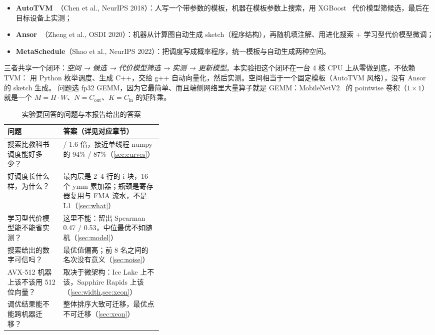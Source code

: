 \documentclass[11pt,a4paper]{ctexart}
\begin{document}
\begin{itemize}
  \item \textbf{AutoTVM~\cite{autotvm}}（Chen et al., NeurIPS 2018）：人写一个带参数的模板，机器在模板参数上搜索，用 XGBoost~\cite{xgboost} 代价模型筛候选，最后在目标设备上实测；
  \item \textbf{Ansor~\cite{ansor}}（Zheng et al., OSDI 2020）：机器从计算图自动生成 sketch（程序结构），再随机填注解、用进化搜索 + 学习型代价模型微调；
  \item \textbf{MetaSchedule}（Shao et al., NeurIPS 2022）：把调度写成概率程序，统一模板与自动生成两种空间。
\end{itemize}

三者共享一个闭环：\emph{空间 → 候选 → 代价模型筛选 → 实测 → 更新模型}。本实验把这个闭环在一台 4 核 CPU 上从零做到底，不依赖 TVM：
用 Python 枚举调度、生成 C++，交给 g++ 自动向量化，然后实测。空间相当于一个固定模板（AutoTVM 风格），没有 Ansor 的 sketch 生成。
问题选 fp32 GEMM，因为它最简单、而且端侧网络里大量算子就是 GEMM：MobileNetV2~\cite{mobilenetv2} 的 pointwise 卷积（$1\times1$）就是一个 $M = H\cdot W$、$N = C_{\text{out}}$、$K = C_{\text{in}}$ 的矩阵乘。

\begin{table}[H]
\centering\small
\caption{实验要回答的问题与本报告给出的答案}\label{tab:questions}
\begin{tabularx}{\linewidth}{>{\raggedright\arraybackslash}p{0.36\linewidth} >{\raggedright\arraybackslash}X}
\toprule
问题 & 答案（详见对应章节） \\
\midrule
搜索比教科书调度能好多少？ & 2.4 / 1.6 倍，接近单线程 numpy 的 94\% / 87\%（\cref{sec:curves}） \\
好调度长什么样，为什么？ & 最内层是 2--4 行的 i 块，16 个 ymm 累加器；瓶颈是寄存器复用与 FMA 流水，不是 L1（\cref{sec:what}） \\
学习型代价模型能不能省实测？ & 这里不能：留出 Spearman 0.47 / 0.53，中位最优不如随机（\cref{sec:model}） \\
搜索给出的数字可信吗？ & 最优值偏高；前 8 名之间的名次没有意义（\cref{sec:noise}） \\
AVX-512 机器上该不该用 512 位向量？ & 取决于微架构：Ice Lake 上不该，Sapphire Rapids 上该（\cref{sec:width,sec:xeon}） \\
调优结果能不能跨机器迁移？ & 整体排序大致可迁移，最优点不可迁移（\cref{sec:xeon}） \\
\bottomrule
\end{tabularx}
\end{table}
\end{document}
